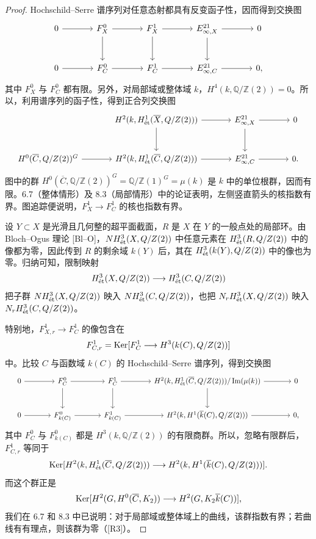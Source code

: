 \begin{proof}
Hochschild--Serre 谱序列对任意态射都具有反变函子性，因而得到交换图
\[
\begin{tikzcd}[ampersand replacement=\&,column sep=large,row sep=large]
 0\arrow[r]\&F_X^0\arrow[r]\arrow[d]\&F_X^1\arrow[r]\arrow[d]
 \&E_{\infty,X}^{21}\arrow[r]\arrow[d]\&0\\
 0\arrow[r]\&F_C^0\arrow[r]\&F_C^1\arrow[r]\&E_{\infty,C}^{21}\arrow[r]\&0,
\end{tikzcd}
\]
其中 $F_X^0$ 与 $F_C^0$ 都有限。另外，对局部域或整体域 $k$，$H^4(k,\mathbb Q/\mathbb Z(2))=0$。所以，利用谱序列的函子性，得到正合列交换图
\[
\resizebox{.98\linewidth}{!}{$
\begin{tikzcd}[ampersand replacement=\&,column sep=large,row sep=large]
 \&H^2(k,H^1_{\et}(\overline X,\mathbb Q/\mathbb Z(2)))\arrow[r]\arrow[d]
 \&E_{\infty,X}^{21}\arrow[r]\arrow[d]\&0\\
 H^0(\overline C,\mathbb Q/\mathbb Z(2))^G\arrow[r]
 \&H^2(k,H^1_{\et}(\overline C,\mathbb Q/\mathbb Z(2)))\arrow[r]
 \&E_{\infty,C}^{21}\arrow[r]\&0.
\end{tikzcd}$}
\]
图中的群 $H^0(\overline C,\mathbb Q/\mathbb Z(2))^G=\mathbb Q/\mathbb Z(1)^G=\mu(k)$ 是 $k$ 中的单位根群，因而有限。6.7（整体情形）及 8.3（局部情形）中的论证表明，左侧竖直箭头的核指数有界。图追踪便说明，$F_X^1\to F_C^1$ 的核也指数有界。

设 $Y\subset X$ 是光滑且几何整的超平面截面，$R$ 是 $X$ 在 $Y$ 的一般点处的局部环。由 Bloch--Ogus 理论 [Bl--O]，$NH^3_{\mathrm{\acute et}}(X,Q/Z(2))$ 中任意元素在 $H^3_{\mathrm{\acute et}}(R,Q/Z(2))$ 中的像都为零，因此传到 $R$ 的剩余域 $k(Y)$ 后，其在 $H^3_{\mathrm{\acute et}}(k(Y),Q/Z(2))$ 中的像也为零。归纳可知，限制映射
\[
 H^3_{\mathrm{\acute et}}(X,Q/Z(2))\longrightarrow H^3_{\mathrm{\acute et}}(C,Q/Z(2))
\]
把子群 $NH^3_{\mathrm{\acute et}}(X,Q/Z(2))$ 映入 $NH^3_{\mathrm{\acute et}}(C,Q/Z(2))$，也把 $N_rH^3_{\mathrm{\acute et}}(X,Q/Z(2))$ 映入 $N_rH^3_{\mathrm{\acute et}}(C,Q/Z(2))$。

特别地，$F_{X,r}^1\to F_C^1$ 的像包含在
\[
 F_{C,r}^1=\operatorname{Ker}[F_C^1\longrightarrow H^3(k(C),Q/Z(2))]
\]
中。比较 $C$ 与函数域 $k(C)$ 的 Hochschild--Serre 谱序列，得到交换图
\[
\resizebox{.98\linewidth}{!}{$
\begin{tikzcd}[ampersand replacement=\&,column sep=large,row sep=large]
 0\arrow[r]\&F_C^0\arrow[r]\arrow[d]\&F_C^1\arrow[r]\arrow[d]
 \&H^2(k,H^1_{\et}(\overline C,\mathbb Q/\mathbb Z(2)))/\im(\mu(k))\arrow[r]\arrow[d]\&0\\
 0\arrow[r]\&F_{k(C)}^0\arrow[r]\&F_{k(C)}^1\arrow[r]
 \&H^2(k,H^1(\overline k(C),\mathbb Q/\mathbb Z(2)))\arrow[r]\&0,
\end{tikzcd}$}
\]
其中 $F_C^0$ 与 $F_{k(C)}^0$ 都是 $H^3(k,\mathbb Q/\mathbb Z(2))$ 的有限商群。所以，忽略有限群后，$F_{C,r}^1$ 等同于
\[
 \operatorname{Ker}[H^2(k,H^1_{\mathrm{\acute et}}(\overline C,Q/Z(2)))
 \longrightarrow H^2(k,H^1(\overline k(C),Q/Z(2)))].
\]
而这个群正是
\[
 \operatorname{Ker}[H^2(G,H^0(\overline C,K_2))
 \longrightarrow H^2(G,K_2\overline k(C))],
\]
我们在 6.7 和 8.3 中已说明：对于局部域或整体域上的曲线，该群指数有界；若曲线有有理点，则该群为零（[R3]）。


\end{proof}

